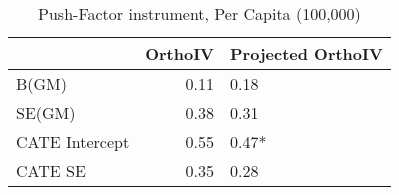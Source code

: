 \begin{table}\centering\caption{Push-Factor instrument, Per Capita (100,000)}\begin{tabular}{lrl}
\toprule
                &   OrthoIV & Projected OrthoIV   \\
\midrule
 B(GM)          &      0.11 & 0.18                \\
 SE(GM)         &      0.38 & 0.31                \\
 CATE Intercept &      0.55 & 0.47*               \\
 CATE SE        &      0.35 & 0.28                \\
\bottomrule
\end{tabular}\end{table}